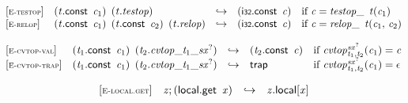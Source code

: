 \vspace{1ex}

$$
\begin{array}{@{}l@{}lcl@{}l@{}}
{[\textsc{\scriptsize E{-}testop}]} \quad & ({\mathit{t}}.\mathsf{const}~\,{\mathit{c}}_{{1}})~\,({\mathit{t}} . {\mathit{testop}}) &\hookrightarrow& (\mathsf{i{\scriptstyle32}}.\mathsf{const}~\,{\mathit{c}}) &\quad
  \mbox{if}~{\mathit{c}} = {{{\mathit{testop}}}{\mathsf{\_}}~\,{\mathit{t}}}{({\mathit{c}}_{{1}})} \\
{[\textsc{\scriptsize E{-}relop}]} \quad & ({\mathit{t}}.\mathsf{const}~\,{\mathit{c}}_{{1}})~\,({\mathit{t}}.\mathsf{const}~\,{\mathit{c}}_{{2}})~\,({\mathit{t}} . {\mathit{relop}}) &\hookrightarrow& (\mathsf{i{\scriptstyle32}}.\mathsf{const}~\,{\mathit{c}}) &\quad
  \mbox{if}~{\mathit{c}} = {{{\mathit{relop}}}{\mathsf{\_}}~\,{\mathit{t}}}{({\mathit{c}}_{{1}},\, {\mathit{c}}_{{2}})} \\
\end{array}
$$

\vspace{1ex}

$$
\begin{array}{@{}l@{}lcl@{}l@{}}
{[\textsc{\scriptsize E{-}cvtop{-}val}]} \quad & ({\mathit{t}}_{{1}}.\mathsf{const}~\,{\mathit{c}}_{{1}})~\,({\mathit{t}}_{{2}} . {{{{{\mathit{cvtop}}}{\mathsf{\_}}}{{\mathit{t}}_{{1}}}}{\mathsf{\_}}}{{{\mathit{sx}}^?}}) &\hookrightarrow& ({\mathit{t}}_{{2}}.\mathsf{const}~\,{\mathit{c}}) &\quad
  \mbox{if}~{{{\mathit{cvtop}}}{{{}_{{\mathit{t}}_{{1}}, {\mathit{t}}_{{2}}}^{{{\mathit{sx}}^?}}}}}{({\mathit{c}}_{{1}})} = {\mathit{c}} \\
{[\textsc{\scriptsize E{-}cvtop{-}trap}]} \quad & ({\mathit{t}}_{{1}}.\mathsf{const}~\,{\mathit{c}}_{{1}})~\,({\mathit{t}}_{{2}} . {{{{{\mathit{cvtop}}}{\mathsf{\_}}}{{\mathit{t}}_{{1}}}}{\mathsf{\_}}}{{{\mathit{sx}}^?}}) &\hookrightarrow& \mathsf{trap} &\quad
  \mbox{if}~{{{\mathit{cvtop}}}{{{}_{{\mathit{t}}_{{1}}, {\mathit{t}}_{{2}}}^{{{\mathit{sx}}^?}}}}}{({\mathit{c}}_{{1}})} = \epsilon \\
\end{array}
$$

\vspace{1ex}

$$
\begin{array}{@{}l@{}lcl@{}l@{}}
{[\textsc{\scriptsize E{-}local.get}]} \quad & {\mathit{z}} ; (\mathsf{local.get}~\,{\mathit{x}}) &\hookrightarrow& {{\mathit{z}}.\mathsf{local}}{{}[{\mathit{x}}]} &  \\
\end{array}
$$

